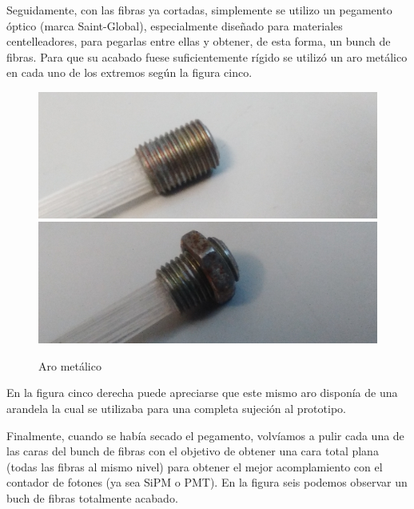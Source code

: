 Seguidamente, con las fibras ya cortadas, simplemente se utilizo un pegamento óptico (marca Saint-Global), especialmente diseñado para materiales centelleadores, para pegarlas entre ellas y obtener, de esta forma, un bunch de fibras. Para que su acabado fuese suficientemente rígido se utilizó un aro metálico en cada uno de los extremos según la figura cinco.

\begin{figure}[htb]
\centering
{
\includegraphics[scale=0.3]{arometalico.png} 
}
{
\includegraphics[scale=0.3]{arometalicoconrosca.png} 
}
\caption{Aro metálico\label{Arofibra}}
\end{figure} 

En la figura cinco derecha puede apreciarse que este mismo aro disponía de una arandela la cual se utilizaba para una completa sujeción al prototipo.

Finalmente, cuando se había secado el pegamento, volvíamos a pulir cada una de las caras del bunch de fibras con el objetivo de obtener una cara total plana (todas las fibras al mismo nivel) para obtener el mejor acomplamiento con el contador de fotones (ya sea SiPM o PMT). En la figura seis podemos observar un buch de fibras totalmente acabado.

